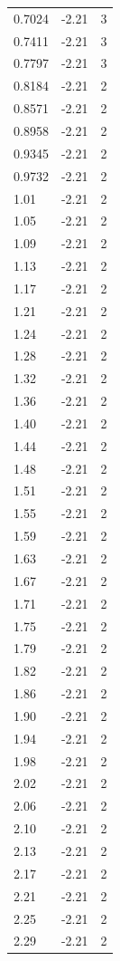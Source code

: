 \begin{longtable}{lrr}
  0.7024 & -2.21 & 3 \\
  0.7411 & -2.21 & 3 \\
  0.7797 & -2.21 & 3 \\
  0.8184 & -2.21 & 2 \\
  0.8571 & -2.21 & 2 \\
  0.8958 & -2.21 & 2 \\
  0.9345 & -2.21 & 2 \\
  0.9732 & -2.21 & 2 \\
  1.01 & -2.21 & 2 \\
  1.05 & -2.21 & 2 \\
  1.09 & -2.21 & 2 \\
  1.13 & -2.21 & 2 \\
  1.17 & -2.21 & 2 \\
  1.21 & -2.21 & 2 \\
  1.24 & -2.21 & 2 \\
  1.28 & -2.21 & 2 \\
  1.32 & -2.21 & 2 \\
  1.36 & -2.21 & 2 \\
  1.40 & -2.21 & 2 \\
  1.44 & -2.21 & 2 \\
  1.48 & -2.21 & 2 \\
  1.51 & -2.21 & 2 \\
  1.55 & -2.21 & 2 \\
  1.59 & -2.21 & 2 \\
  1.63 & -2.21 & 2 \\
  1.67 & -2.21 & 2 \\
  1.71 & -2.21 & 2 \\
  1.75 & -2.21 & 2 \\
  1.79 & -2.21 & 2 \\
  1.82 & -2.21 & 2 \\
  1.86 & -2.21 & 2 \\
  1.90 & -2.21 & 2 \\
  1.94 & -2.21 & 2 \\
  1.98 & -2.21 & 2 \\
  2.02 & -2.21 & 2 \\
  2.06 & -2.21 & 2 \\
  2.10 & -2.21 & 2 \\
  2.13 & -2.21 & 2 \\
  2.17 & -2.21 & 2 \\
  2.21 & -2.21 & 2 \\
  2.25 & -2.21 & 2 \\
  2.29 & -2.21 & 2 \\

\end{longtable}
